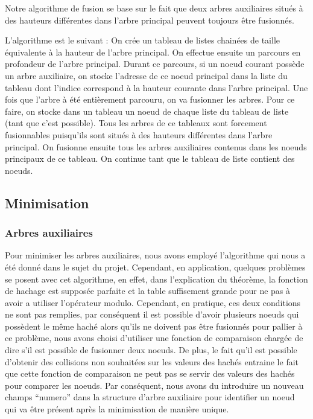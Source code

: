 \documentclass[15pt, a4paper]{article}
\begin{document}
Notre algorithme de fusion se base sur le fait que deux arbres auxiliaires 
situés à des hauteurs différentes dans l'arbre principal peuvent toujours être
fusionnés.

\bigskip

L'algorithme est le suivant : On crée un tableau de listes chainées de taille 
équivalente à la hauteur de l'arbre principal. On effectue ensuite un 
parcours en profondeur de l'arbre principal. Durant ce parcours, si un noeud
courant possède un arbre auxiliaire, on stocke l'adresse de ce noeud principal
dans la liste du tableau dont l'indice correspond à la hauteur courante
dans l'arbre principal. Une fois que l'arbre à été entièrement parcouru, on va 
fusionner les arbres. Pour ce faire, on stocke dans un tableau un noeud de 
chaque liste du tableau de liste (tant que c'est possible). Tous les arbres 
de ce tableaux sont forcement fusionnables puisqu'ils sont situés à des 
hauteurs différentes dans l'arbre principal. On fusionne ensuite tous les 
arbres auxiliaires contenus dans les noeuds principaux de ce tableau. On 
continue tant que le tableau de liste contient des noeuds.

\subsection{Minimisation}

\subsubsection{Arbres auxiliaires} 

Pour minimiser les arbres auxiliaires, nous avons employé l'algorithme
qui nous a été donné dans le sujet du projet. Cependant, en application, quelques 
problèmes se posent avec cet algorithme, en effet, dans l'explication du théorème,
la fonction de hachage est supposée parfaite et la table suffisement grande pour
ne pas à avoir a utiliser l'opérateur modulo. Cependant, en pratique, ces deux 
conditions ne sont pas remplies, par conséquent il est possible d'avoir plusieurs
noeuds qui possèdent le même haché alors qu'ils ne doivent pas être fusionnés pour
pallier à ce problème, nous avons choisi d'utiliser une fonction de comparaison
chargée de dire s'il est possible de fusionner deux noeuds. De plus, le fait qu'il
est possible d'obtenir des collisions non souhaitées sur les valeurs des hachés
entraine le fait que cette fonction de comparaison ne peut pas se servir des valeurs
des hachés pour comparer les noeuds. Par conséquent, nous avons du introduire un 
nouveau champs ``numero'' dans la structure d'arbre auxiliaire pour identifier un
noeud qui va être présent après la minimisation de manière unique.
\end{document}
